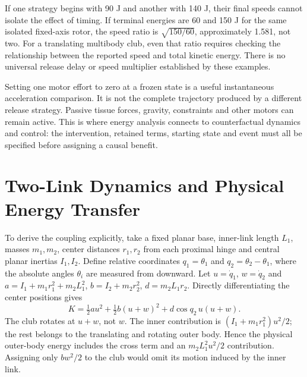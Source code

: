 If one strategy begins with 90 J and another with 140 J, their final speeds
cannot isolate the effect of timing. If terminal energies are 60 and 150 J
for the same isolated fixed-axis rotor, the speed ratio is $\sqrt{150/60}$,
approximately 1.581, not two. For a translating multibody club, even that ratio
requires checking the relationship between the reported speed and total kinetic
energy. There is no universal release delay or speed multiplier established by
these examples.

Setting one motor effort to zero at a frozen state is a useful instantaneous
acceleration comparison. It is not the complete trajectory produced by a
different release strategy. Passive tissue forces, gravity, constraints and
other motors can remain active. This is where energy analysis connects to
counterfactual dynamics and control: the intervention, retained terms, starting
state and event must all be specified before assigning a causal benefit.

\section{Two-Link Dynamics and Physical Energy Transfer}
\label{sec:double_pendulum_energy}

To derive the coupling explicitly, take a fixed planar base, inner-link length
$L_1$, masses $m_1,m_2$, center distances $r_1,r_2$ from each proximal hinge and
central planar inertias $I_1,I_2$. Define relative coordinates
$q_1=\theta_1$ and $q_2=\theta_2-\theta_1$, where the absolute angles $\theta_i$
are measured from downward. Let $u=\dot q_1$, $w=\dot q_2$ and
$a=I_1+m_1r_1^2+m_2L_1^2$, $b=I_2+m_2r_2^2$, $d=m_2L_1r_2$.
Directly differentiating the center positions gives
\begin{equation}
K=\tfrac12a u^2+\tfrac12b(u+w)^2+d\cos q_2\,u(u+w).
\label{eq:double_pend_kinetic_energy}
\end{equation}
The club rotates at $u+w$, not $w$. The inner contribution is
$(I_1+m_1r_1^2)u^2/2$; the rest belongs to the translating and rotating outer
body. Hence the physical outer-body energy includes the cross term and an
$m_2L_1^2u^2/2$ contribution. Assigning only $bw^2/2$ to the club would omit
its motion induced by the inner link.

